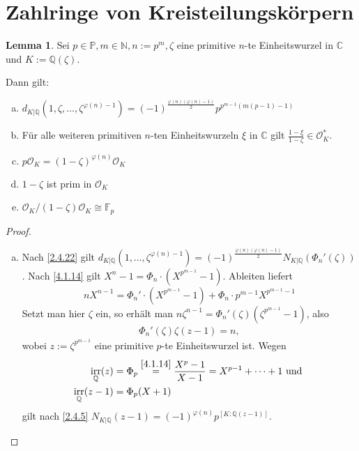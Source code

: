 \documentclass[
twoside=semi,
fontsize=12,
DIV=12, 
cleardoublepage=current,
leqno,
headings=optiontoheadandtoc, 
toc=idx
]{scrbook}
\newcommand{\N}{\mathbb{N}}
\newcommand{\Q}{\mathbb{Q}}
\newcommand{\C}{\mathbb{C}}
\newcommand{\F}{\mathbb{F}}
\renewcommand{\P}{\mathbb{P}}
\DeclareMathOperator{\irr}{irr}
\theoremstyle{definition}
\newtheorem{lemma}[definition]{Lemma}
\begin{document}
 	\section{Zahlringe von Kreisteilungsk\"orpern}\thispagestyle{sectionstart}
 	\begin{lemma}\label{4.2.1}\hfill\newline
 		Sei $p \in \P, m \in \N, n := p^m, \zeta$ eine primitive $n$-te Einheitswurzel in $\C$ und $K:= \Q(\zeta)$.
 		
 		\medskip\noindent
 		Dann gilt:
 		\begin{enumerate}[(a)]
 			\item $d_{K|\Q}(1,\zeta,\dots, \zeta^{\varphi(n)-1}) = (-1)^{\frac{\varphi(n)(\varphi(n)-1)}{2}} p^{p^{m-1}(m(p-1)-1)}$
 			\item F\"ur alle weiteren primitiven $n$-ten Einheitswurzeln $\xi$ in $\C$ gilt $\frac{1-\xi}{1-\zeta} \in \mathcal{O}_K^*$.
 			\item $p\mathcal{O}_K = (1-\zeta)^{\varphi(n)}\mathcal{O}_K$
 			\item $1-\zeta$ ist prim in $\mathcal{O}_K$
 			\item $\mathcal{O}_K/(1-\zeta)\mathcal{O}_K \cong \F_p$
 		\end{enumerate}
 	
 		\begin{proof}\hfill
 			\begin{enumerate}[(a)]
 				\item Nach \ref{2.4.22} gilt $d_{K|\Q}(1,\dots, \zeta^{\varphi(n)-1}) = (-1)^{\frac{\varphi(n)(\varphi(n)-1)}{2}}N_{K|\Q}(\Phi_n'(\zeta))$.
 				Nach \ref{4.1.14} gilt $X^n-1 = \Phi_n\cdot (X^{p^{m-1}}-1)$. Ableiten liefert
 					\[nX^{n-1} = \Phi_n'\cdot (X^{p^{m-1}}-1) + \Phi_n \cdot p^{m-1}X^{p^{m-1}-1}\]
 				Setzt man hier $\zeta$ ein, so erh\"alt man $n\zeta^{n-1} = \Phi_n'(\zeta)(\zeta^{p^{m-1}} - 1)$, also 
 				\begin{align}
 					\Phi_n'(\zeta)\zeta(z-1) = n, \label{4.2.1.1}\tag{$*$}
 				\end{align}
 				wobei $z:= \zeta^{p^{m-1}}$ eine primitive $p$-te Einheitswurzel ist. Wegen
 				\begin{align*}
 					\irr_\Q(z) &= \Phi_p \overset{\ref{4.1.14}}{=} \frac{X^p-1}{X-1} = X^{p-1} + \cdots + 1 \textrm{ und }\\
 					\irr_\Q(z-1) &= \Phi_p(X+1)
 				\end{align*}
 				gilt nach \ref{2.4.5} $N_{K|\Q}(z-1) = (-1)^{\varphi(n)}p^{[K:\Q(z-1)]}$. 
 				

\end{enumerate}
\end{proof}
\end{lemma}
\end{document}
